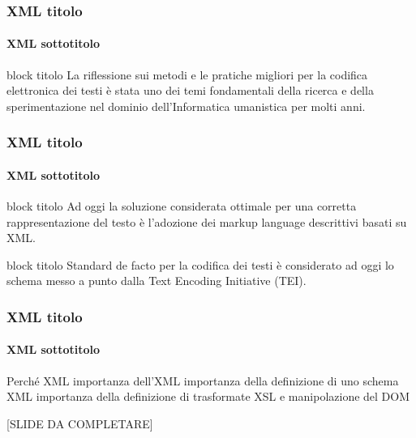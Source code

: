 






\begin{frame}
	\frametitle{XML titolo}
	\framesubtitle{XML sottotitolo}
	\addtocounter{nframe}{1}

	\begin{block}{block titolo}
		La riflessione sui metodi e le pratiche migliori per la codifica elettronica dei testi è stata uno dei temi fondamentali della ricerca e della sperimentazione nel dominio dell’Informatica umanistica per molti anni.
	\end{block}

\end{frame}

\begin{frame}
	\frametitle{XML titolo}
	\framesubtitle{XML sottotitolo}
	\addtocounter{nframe}{1}

	\begin{block}{block titolo}
		Ad oggi la soluzione considerata ottimale per una corretta rappresentazione del testo è l'adozione dei markup language descrittivi basati su XML.
	\end{block}

	\begin{block}{block titolo}
		Standard de facto per la codifica dei testi è considerato ad oggi lo schema messo a punto dalla Text Encoding Initiative (TEI).
	\end{block}

\end{frame}


\begin{frame}
	\frametitle{XML titolo}
	\framesubtitle{XML sottotitolo}
	\addtocounter{nframe}{1}

	\begin{block}{Perché XML}
		importanza dell'XML
		importanza della definizione di uno schema XML
		importanza della definizione di trasformate XSL e manipolazione del DOM
	\end{block}
	[SLIDE DA COMPLETARE]

\end{frame}



